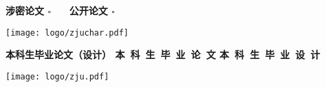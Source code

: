 \thispagestyle{empty}
\setcounter{page}{-1}

\begin{flushright}
    {\bfseries 涉密论文 $\square$ ~~ 公开论文 $\square$ }
\end{flushright}

\vskip 10mm

\begin{center}
    \texttt{[image: logo/zjuchar.pdf]}
\end{center}

\begin{center}
     \heiti \bfseries
    {
        本科生毕业论文（设计）
    }
        {
            {
                本~科~生~毕~业~论~文
            }
            {
                本~科~生~毕~业~设~计
            }
    }
\end{center}

\vskip 20pt

\begin{center}
    \texttt{[image: logo/zju.pdf]}
\end{center}

\vskip 20pt

